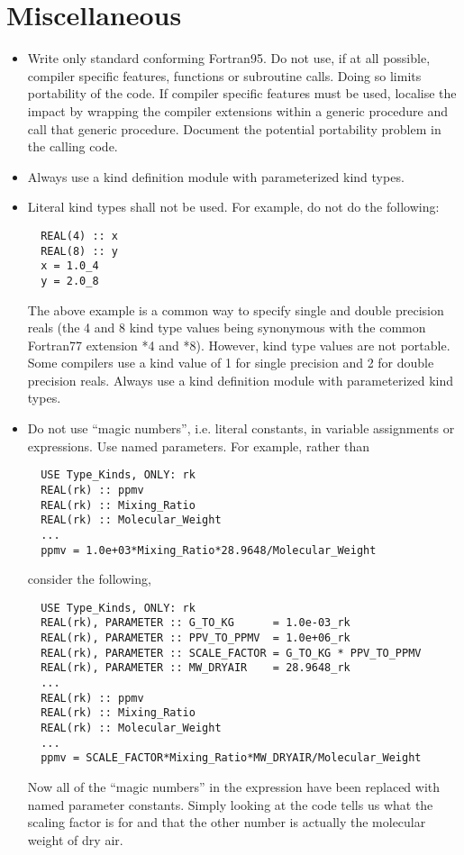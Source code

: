 \section{Miscellaneous}
\begin{itemize}
  \item Write only standard conforming Fortran95. Do not use, if at all possible, compiler specific features, functions or subroutine calls. Doing so limits portability of the code. If compiler specific features must be used, localise the impact by wrapping the compiler extensions within a generic procedure and call that generic procedure. Document the potential portability problem in the calling code.
  \item Always use a kind definition module with parameterized kind types.
  \item Literal kind types shall not be used. For example, do not do the following:
  \begin{verbatim}
  REAL(4) :: x
  REAL(8) :: y
  x = 1.0_4
  y = 2.0_8\end{verbatim}
The above example is a common way to specify single and double precision reals (the 4 and 8 kind type values being synonymous with the common Fortran77 extension *4 and *8). However, kind type values are not portable. Some compilers use a kind value of 1 for single precision and 2 for double precision reals. Always use a kind definition module with parameterized kind types.
  \item Do not use ``magic numbers'', i.e. literal constants, in variable assignments or expressions. Use named parameters. For example, rather than
  \begin{verbatim}
  USE Type_Kinds, ONLY: rk
  REAL(rk) :: ppmv
  REAL(rk) :: Mixing_Ratio
  REAL(rk) :: Molecular_Weight
  ...
  ppmv = 1.0e+03*Mixing_Ratio*28.9648/Molecular_Weight\end{verbatim}
consider the following,
  \begin{verbatim}
  USE Type_Kinds, ONLY: rk
  REAL(rk), PARAMETER :: G_TO_KG      = 1.0e-03_rk
  REAL(rk), PARAMETER :: PPV_TO_PPMV  = 1.0e+06_rk
  REAL(rk), PARAMETER :: SCALE_FACTOR = G_TO_KG * PPV_TO_PPMV
  REAL(rk), PARAMETER :: MW_DRYAIR    = 28.9648_rk
  ...
  REAL(rk) :: ppmv
  REAL(rk) :: Mixing_Ratio
  REAL(rk) :: Molecular_Weight
  ...
  ppmv = SCALE_FACTOR*Mixing_Ratio*MW_DRYAIR/Molecular_Weight\end{verbatim}
Now all of the ``magic numbers'' in the expression have been replaced with named parameter constants. Simply looking at the code tells us what the scaling factor is for and that the other number is actually the molecular weight of dry air.

\end{itemize}
